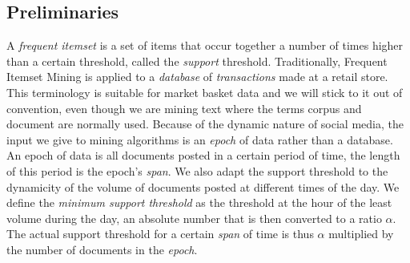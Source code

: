 \documentclass{sig-alternate}
\begin{document}
\subsection{Preliminaries}
A \emph{frequent itemset} is a set of items that occur together a number of times higher than a certain threshold, called the \emph{support} threshold. Traditionally, Frequent Itemset Mining is applied to a \emph{database} of \emph{transactions} made at a retail store. This terminology is suitable for market basket data and we will stick to it out of convention, even though we are mining text where the terms corpus and document are normally used. Because of the dynamic nature of social media, the input we give to mining algorithms is an \emph{epoch} of data rather than a database. An epoch of data is all documents posted in a certain period of time, the length of this period is the epoch's \emph{span}. We also adapt the support threshold to the dynamicity of the volume of documents posted at different times of the day. We define the \emph{minimum support threshold} as the threshold at the hour of the least volume during the day, an absolute number that is then converted to a ratio $\alpha$. The actual support threshold for a certain \emph{span} of time is thus $\alpha$ multiplied by the number of documents in the \emph{epoch}. 


\end{document}
